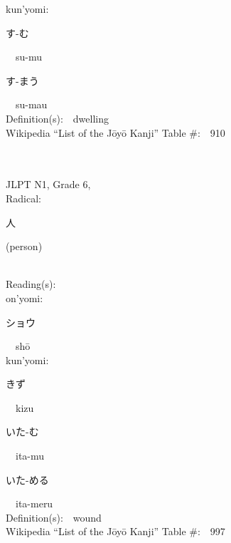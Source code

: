 \begin{multicols}{2}
{\hspace*{1em}}kun'yomi:\ \ \\
{\hspace*{2em}}{\begin{CJK}{UTF8}{min} す-む \end{CJK}}\ \ su-mu\ \ \\
{\hspace*{2em}}{\begin{CJK}{UTF8}{min} す-まう \end{CJK}}\ \ su-mau\ \ \\
Definition(s):\ \ dwelling \\
Wikipedia ``List of the J\=oy\=o Kanji'' Table \#:\ \ 910 \\
\ \ \\
{\fontsize{34pt}{40pt}  }\ \ \\  %
{JLPT N1, Grade 6, \\Radical:\ \ {\begin{CJK}{UTF8}{min} 人 \end{CJK}} (person) } \\
Reading(s):\ \ \\
{\hspace*{1em}}on'yomi:\ \ \\
{\hspace*{2em}}{\begin{CJK}{UTF8}{min} ショウ \end{CJK}}\ \ sh\=o\ \ \\
{\hspace*{1em}}kun'yomi:\ \ \\
{\hspace*{2em}}{\begin{CJK}{UTF8}{min} きず \end{CJK}}\ \ kizu\ \ \\
{\hspace*{2em}}{\begin{CJK}{UTF8}{min} いた-む \end{CJK}}\ \ ita-mu\ \ \\
{\hspace*{2em}}{\begin{CJK}{UTF8}{min} いた-める \end{CJK}}\ \ ita-meru\ \ \\
Definition(s):\ \ wound \\
Wikipedia ``List of the J\=oy\=o Kanji'' Table \#:\ \ 997 \\

\end{multicols}
